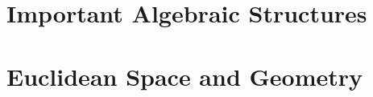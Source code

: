 \begin{appendices}
    \section{Important Algebraic Structures}
    
    
    \section{Euclidean Space and Geometry}
\end{appendices}
